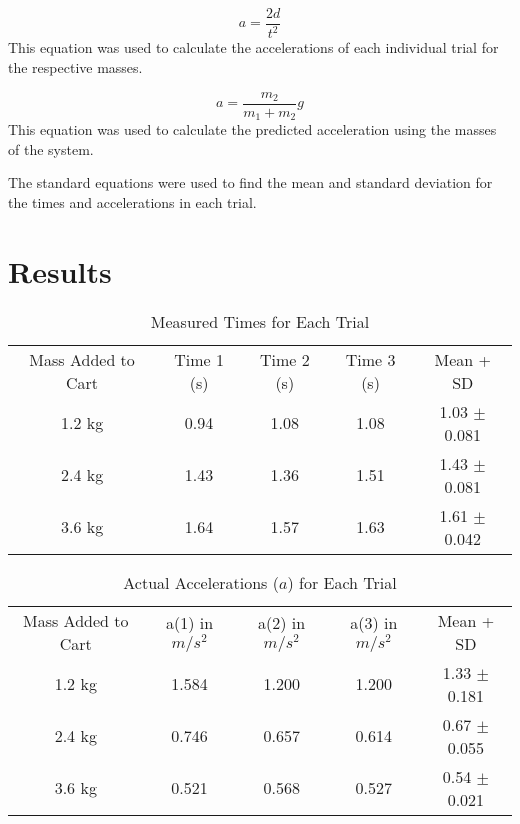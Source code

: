 \documentclass[reprint,amsmath,amssymb,aps]{revtex4-2}
\begin{document}
\begin{equation} 
a = \frac{2d}{t^2}
\label{eq:4} 
\end{equation}
This equation was used to calculate the accelerations of each individual trial for the respective masses. \cite{tipler}

\begin{equation} 
a = \dfrac{m_2}{m_1 + m_2} g
\label{eq:5}
\end{equation}
This equation was used to calculate the predicted acceleration using the masses of the system. \cite{tipler} 

The standard equations were used to find the mean and standard deviation for the times and accelerations in each trial.








\section{Results}
\begin{table} %
\centering
\begin{tabular}{ccccc}
  Mass Added to Cart & Time 1 (s) & Time 2 (s) & Time 3 (s) & Mean + SD \\ 
  1.2 kg& 0.94 & 1.08 & 1.08 & 1.03 $\pm$ 0.081\\ 
  2.4 kg& 1.43 & 1.36 & 1.51 & 1.43 $\pm$ 0.081 \\ 
  3.6 kg& 1.64 & 1.57 & 1.63 & 1.61 $\pm$ 0.042 \\ 
\end{tabular}
\caption{Measured Times for Each Trial} 
\label{Times of Trials} 
\end{table}

\begin{table} %
\centering
\begin{tabular}{ccccc}
  Mass Added to Cart & a(1) in $m/s^2$ & a(2) in $m/s^2$ & a(3) in $m/s^2$ & Mean + SD  \\ 
  1.2 kg& 1.584 & 1.200  & 1.200 & 1.33 $\pm$ 0.181\\ 
  2.4 kg& 0.746 & 0.657 & 0.614 & 0.67 $\pm$ 0.055 \\ 
  3.6 kg& 0.521 & 0.568 & 0.527 & 0.54 $\pm$ 0.021 \\ 
\end{tabular}
\caption{Actual Accelerations ($a$) for Each Trial}
\label{Accelerations for Each Trial} 
\end{table}
\end{document}
